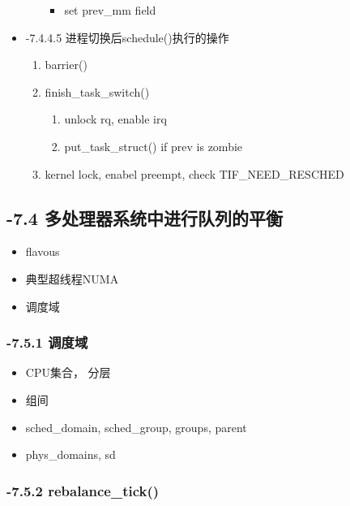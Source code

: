 \documentclass[11pt]{article}
\begin{document}
\begin{itemize}
\begin{enumerate}
\begin{itemize}
\item set prev\_mm field
\end{itemize}

\end{enumerate}

\item -7.4.4.5 进程切换后schedule()执行的操作\\
\label{sec-2.4.4.5}

\begin{enumerate}
\item barrier()
\item finish\_task\_switch()

\begin{enumerate}
\item unlock rq, enable irq
\item put\_task\_struct() if prev is zombie
\end{enumerate}

\item kernel lock, enabel preempt, check TIF\_NEED\_RESCHED
\end{enumerate}
\end{itemize} %
\subsection{-7.4 多处理器系统中进行队列的平衡}
\label{sec-2.5}

\begin{itemize}
\item flavous
\item 典型超线程NUMA
\item 调度域
\end{itemize}
\subsubsection{-7.5.1 调度域}
\label{sec-2.5.1}

\begin{itemize}
\item CPU集合， 分层
\item 组间
\item sched\_domain, sched\_group, groups, parent
\item phys\_domains, sd
\end{itemize}
\subsubsection{-7.5.2 rebalance\_tick()}
\label{sec-2.5.2}
\end{document}
